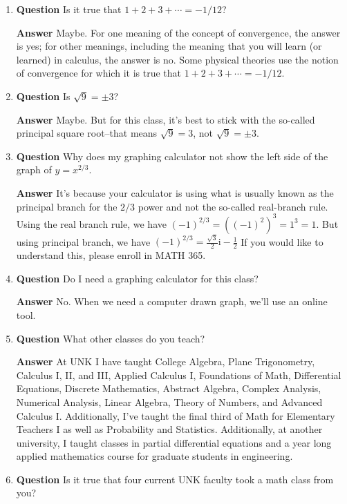 \documentclass[11pt]{article}
\newcounter{ex}\setcounter{ex}{0}
\newcounter{cd}\setcounter{cd}{24}
\begin{document}
\begin{enumerate}
\item  \textbf{Question} Is it true that \(1 + 2 + 3 + \cdots = -1/12\)?

  \textbf{Answer}  Maybe. For one meaning of the concept of convergence, the answer is yes; for other meanings, including the meaning that you will learn (or learned)  in calculus, the answer is no.  Some physical theories use the notion of convergence for which it is true that \(1 + 2 + 3 + \cdots = -1/12\).

\item  \textbf{Question} Is \(\sqrt{9} = \pm 3\)?

  \textbf{Answer}  Maybe.  But for this class, it's best to stick with the so-called 
  principal square root--that means \(\sqrt{9} = 3\), not  \(\sqrt{9} = \pm 3\).

\item  \textbf{Question} Why does my graphing calculator not show the left side of the graph of \(y = x^{2/3}\). 

\textbf{Answer} It's because your calculator is using what is usually known as the principal branch for the \(2/3\) power and not the so-called real-branch rule.  Using the real branch rule,
we have \((-1)^{2/3} = ((-1)^2)^3 = 1^3 = 1\). But using principal branch, we have \((-1)^{2/3} = \frac{\sqrt{3}}{2}  \mathrm{i}  -\frac{1}{2}\) If you would like to understand this, please enroll in MATH 365.

\item \textbf{Question} Do I need a graphing calculator for this class?

\textbf{Answer} No. When we need a computer drawn graph, we'll use an online tool.

\item \textbf{Question} What other classes do you teach?

\textbf{Answer} At UNK I have taught College Algebra, 
   Plane Trigonometry, Calculus I, II, and III, Applied Calculus I,
   Foundations of Math, Differential Equations, Discrete Mathematics, Abstract Algebra, Complex Analysis,
   Numerical Analysis, Linear Algebra, Theory of Numbers, and Advanced Calculus I. Additionally, I've
   taught the final third of Math for Elementary Teachers I as well as  Probability and Statistics.
   Additionally, at another university, I taught classes in partial differential equations and a
   year long applied mathematics course for graduate students in engineering.

\item  \textbf{Question} Is it true that four current UNK faculty took a math class from you?


\end{enumerate}
\end{document}
